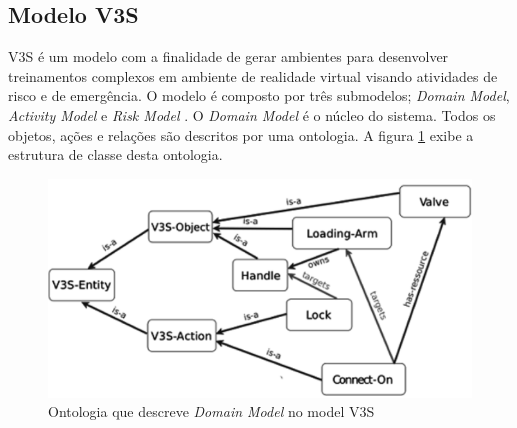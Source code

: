 \subsection{Modelo V3S}

V3S é um modelo com a finalidade de gerar ambientes para desenvolver treinamentos complexos em ambiente de realidade virtual visando atividades de risco e de emergência. O modelo é composto por três submodelos; \textit{Domain Model}, \textit{Activity Model} e \textit{Risk Model} \cite{v3sframework}. O \textit{Domain Model} é o núcleo do sistema. Todos os objetos, ações e relações são descritos por uma ontologia. 
A figura \ref{domainmodel} exibe a estrutura de classe desta ontologia.

\begin{figure}[H]
  \centering
  \includegraphics[width=0.5\linewidth]{figure/ontologyv3.png} 
  \caption{Ontologia que descreve \textit{Domain Model} no model V3S \cite{v3sframework}}
  \label{domainmodel}
\end{figure}

